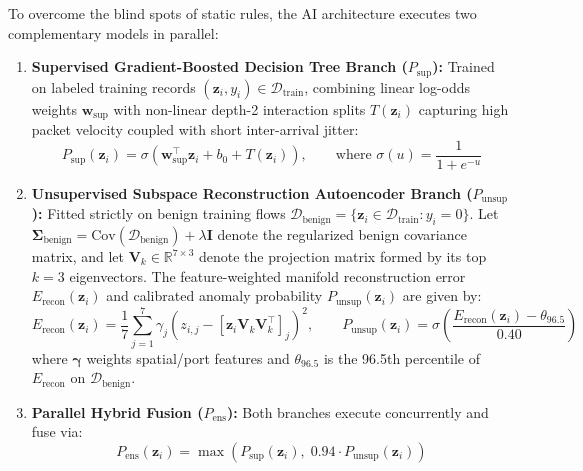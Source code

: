\documentclass[10pt,a4paper]{article}
\begin{document}
To overcome the blind spots of static rules, the AI architecture executes two complementary models in parallel:
\begin{enumerate}
\setlength{\itemsep}{2pt}\setlength{\parskip}{0pt}
\item \textbf{Supervised Gradient-Boosted Decision Tree Branch ($P_{\text{sup}}$):} Trained on labeled training records $(\mathbf{z}_i, y_i) \in \mathcal{D}_{\text{train}}$, combining linear log-odds weights $\mathbf{w}_{\text{sup}}$ with non-linear depth-2 interaction splits $T(\mathbf{z}_i)$ capturing high packet velocity coupled with short inter-arrival jitter:
\begin{equation}
P_{\text{sup}}(\mathbf{z}_i) = \sigma\!\left( \mathbf{w}_{\text{sup}}^\top \mathbf{z}_i + b_0 + T(\mathbf{z}_i) \right), \qquad \text{where } \sigma(u) = \frac{1}{1 + e^{-u}}
\end{equation}
\item \textbf{Unsupervised Subspace Reconstruction Autoencoder Branch ($P_{\text{unsup}}$):} Fitted strictly on benign training flows $\mathcal{D}_{\text{benign}} = \{\mathbf{z}_i \in \mathcal{D}_{\text{train}} : y_i = 0\}$. Let $\mathbf{\Sigma}_{\text{benign}} = \text{Cov}(\mathcal{D}_{\text{benign}}) + \lambda \mathbf{I}$ denote the regularized benign covariance matrix, and let $\mathbf{V}_k \in \mathbb{R}^{7 \times 3}$ denote the projection matrix formed by its top $k = 3$ eigenvectors. The feature-weighted manifold reconstruction error $E_{\text{recon}}(\mathbf{z}_i)$ and calibrated anomaly probability $P_{\text{unsup}}(\mathbf{z}_i)$ are given by:
\begin{equation}
E_{\text{recon}}(\mathbf{z}_i) = \frac{1}{7} \sum_{j=1}^{7} \gamma_j \left( z_{i,j} - [\mathbf{z}_i \mathbf{V}_k \mathbf{V}_k^\top]_j \right)^2, \qquad P_{\text{unsup}}(\mathbf{z}_i) = \sigma\!\left( \frac{E_{\text{recon}}(\mathbf{z}_i) - \theta_{96.5}}{0.40} \right)
\end{equation}
where $\boldsymbol{\gamma}$ weights spatial/port features and $\theta_{96.5}$ is the 96.5th percentile of $E_{\text{recon}}$ on $\mathcal{D}_{\text{benign}}$.
\item \textbf{Parallel Hybrid Fusion ($P_{\text{ens}}$):} Both branches execute concurrently and fuse via:
\begin{equation}
P_{\text{ens}}(\mathbf{z}_i) = \max\!\left( P_{\text{sup}}(\mathbf{z}_i), \; 0.94 \cdot P_{\text{unsup}}(\mathbf{z}_i) \right)
\end{equation}
\end{enumerate}
\end{document}
